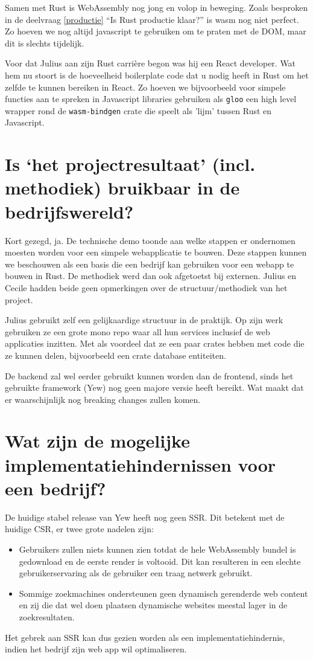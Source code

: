 Samen met Rust is WebAssembly nog jong en volop in beweging. Zoals besproken in de deelvraag
\ref{productie} \enquote{Is Rust productie klaar?} is wasm nog niet perfect. Zo hoeven we nog altijd
javascript te gebruiken om te praten met de DOM, maar dit is slechts tijdelijk.

Voor dat Julius aan zijn Rust carrière begon was hij een React developer. Wat hem nu stoort is de
hoeveelheid boilerplate code dat u nodig heeft in Rust om het zelfde te kunnen bereiken in React.
Zo hoeven we bijvoorbeeld voor simpele functies aan te spreken in Javascript libraries gebruiken als
\texttt{gloo} een high level wrapper rond de \texttt{wasm-bindgen} crate die
speelt als 'lijm' tussen Rust en Javascript.

\clearpage

\section{Is ‘het projectresultaat’ (incl. methodiek) bruikbaar in de bedrijfswereld?}

Kort gezegd, ja. De technische demo toonde aan welke stappen er ondernomen moesten worden voor een
simpele webapplicatie te bouwen. Deze stappen kunnen we beschouwen als een basis die een bedrijf kan
gebruiken voor een webapp te bouwen in Rust. De methodiek werd dan ook afgetoetst bij externen.
Julius en Cecile hadden beide geen opmerkingen over de structuur/methodiek van het project. 

Julius gebruikt zelf een gelijkaardige structuur in de praktijk. Op zijn werk gebruiken ze een grote
mono repo waar all hun services inclusief de web applicaties inzitten. Met als voordeel dat ze een
paar crates hebben met code die ze kunnen delen, bijvoorbeeld een crate database entiteiten.

De backend zal wel eerder gebruikt kunnen worden dan de frontend, sinds het gebruikte framework
(Yew) nog geen majore versie heeft bereikt. Wat maakt dat er waarschijnlijk nog breaking changes
zullen komen.


\section{Wat zijn de mogelijke implementatiehindernissen voor een bedrijf?}

De huidige stabel release van Yew heeft nog geen SSR. Dit betekent met de huidige CSR, er twee grote
nadelen zijn:
\begin{itemize}
   \item Gebruikers zullen niets kunnen zien totdat de hele WebAssembly bundel is gedownload en de
   eerste render is voltooid. Dit kan resulteren in een slechte gebruikerservaring als de gebruiker
   een traag netwerk gebruikt.

  \item Sommige zoekmachines ondersteunen geen dynamisch gerenderde web content en zij die dat wel
  doen plaatsen dynamische websites meestal lager in de zoekresultaten.
\end{itemize}
Het gebrek aan SSR kan dus gezien worden als een implementatiehindernis, indien het bedrijf zijn web
app wil optimaliseren.

